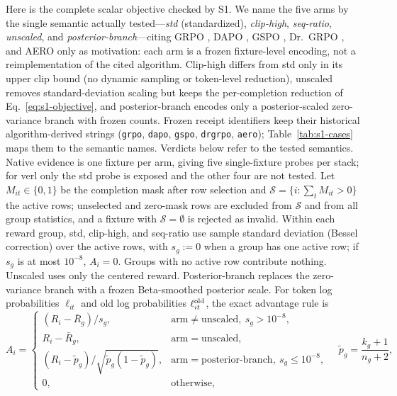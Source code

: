 \documentclass{article}
\begin{document}
Here is the complete scalar objective checked by S1.  We name the five arms
by the single semantic actually tested---\emph{std} (standardized),
\emph{clip-high}, \emph{seq-ratio}, \emph{unscaled}, and
\emph{posterior-branch}---citing GRPO \citep{shao2024deepseekmath}, DAPO
\citep{yu2025dapo}, GSPO \citep{zheng2025gspo}, Dr.~GRPO
\citep{liu2025drgrpo}, and AERO \citep{zhang2026aero} only as motivation:
each arm is a frozen fixture-level encoding, not a reimplementation of the
cited algorithm.  Clip-high differs from std only in its upper clip bound
(no dynamic sampling or token-level reduction), unscaled removes
standard-deviation scaling but keeps the per-completion reduction of
Eq.~\eqref{eq:s1-objective}, and posterior-branch encodes only a
posterior-scaled zero-variance branch with frozen counts.  Frozen receipt
identifiers keep their historical algorithm-derived strings
(\texttt{grpo}, \texttt{dapo}, \texttt{gspo}, \texttt{drgrpo},
\texttt{aero}); Table~\ref{tab:s1-cases} maps them to the semantic names.
Verdicts below refer to the tested semantics.  Native evidence is one
fixture per arm, giving five single-fixture probes per stack; for verl only
the std probe is exposed and the other four are not tested.  Let $M_{it}\in\{0,1\}$
be the completion mask after row selection and
$\mathcal S=\{i:\sum_tM_{it}>0\}$ the active rows; unselected and zero-mask rows
are excluded from $\mathcal S$ and from all group statistics, and a fixture
with $\mathcal S=\emptyset$ is rejected as invalid.  Within each reward group,
std, clip-high, and seq-ratio use sample standard deviation (Bessel
correction) over the active rows, with $s_g:=0$ when a group has one active
row; if $s_g$ is at most $10^{-8}$, $A_i=0$.  Groups with no active row
contribute nothing.  Unscaled uses only the centered reward.
Posterior-branch replaces the zero-variance branch with a frozen
Beta-smoothed posterior scale.  For token log probabilities $\ell_{it}$ and
old log probabilities $\ell^{\rm old}_{it}$, the exact advantage rule is
\begin{equation}
A_i=\begin{cases}
(R_i-\bar R_g)/s_g, & \text{arm}\ne\text{unscaled},\ s_g>10^{-8},\\
R_i-\bar R_g, & \text{arm}=\text{unscaled},\\
(R_i-\tilde p_g)/\sqrt{\tilde p_g(1-\tilde p_g)},
  & \text{arm}=\text{posterior-branch},\ s_g\leq10^{-8},\\
0, & \text{otherwise},
\end{cases}
\quad \tilde p_g=\frac{k_g+1}{n_g+2},
\label{eq:s1-advantage}
\end{equation}
\end{document}
